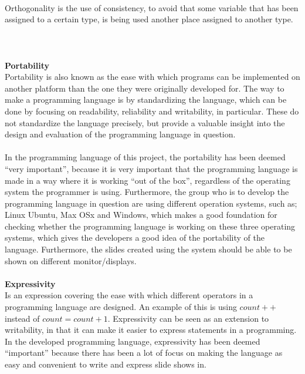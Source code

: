  \\
Orthogonality is the use of consistency, to avoid that some variable that has been assigned to a certain type, is being used another place assigned to another type.
\\ \\
\\ \\
\textbf{Portability} \\
Portability is also known as the ease with which programs can be implemented on another platform than the one they were originally developed for. The way to make a programming language is by standardizing the language, which can be done by focusing on readability, reliability and writability, in particular. These do not standardize the language precisely, but provide a valuable insight into the design and evaluation of the programming language in question.
\\ \\
In the programming language of this project, the portability has been deemed ``very important'', because it is very important that the programming language is made in a way where it is working ``out of the box'', regardless of the operating system the programmer is using. Furthermore, the group who is to develop the programming language in question are using different operation systems, such as; Linux Ubuntu, Max OSx and Windows, which makes a good foundation for checking whether the programming language is working on these three operating systems, which gives the developers a good idea of the portability of the language. Furthermore, the slides created using the system should be able to be shown on different monitor/displays.
\\ \\
\textbf{Expressivity} \\
Is an expression covering the ease with which different operators in a programming language are designed. An example of this is using $count++$ instead of $count = count + 1$. Expressivity can
be seen as an extension to writability, in that it can make it easier to express statements in a programming. In the developed programming language, expressivity has been deemed ``important'' because there has been a lot of focus on making the language as easy and convenient to write and express slide shows in.
\\ \\
